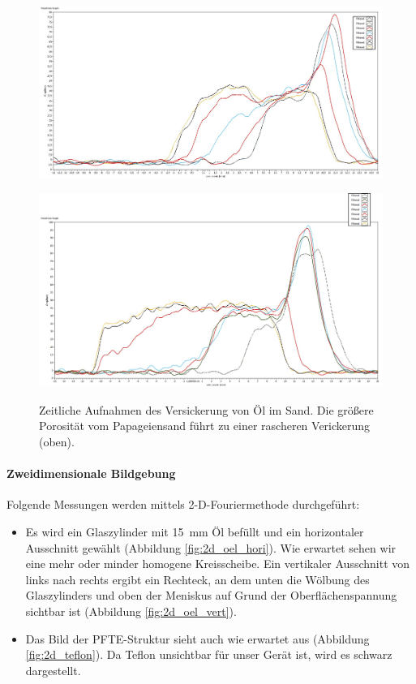 \documentclass[a4paper]{scrartcl} %
\begin{document}
\begin{figure}[htbp]
	{
		\centering
		\includegraphics[width=.8 \linewidth]{./Resources/Teil_3/oeldiff_chinchilla.jpg}
		\label{fig:oeldiff_chinchilla}
		\vspace{1cm}
		
		\centering
		\includegraphics[width=.8 \linewidth]{./Resources/Teil_3/oeldiff_papa.jpg}
		\label{fig:oeldiff_papa}
	}	
	\caption{Zeitliche Aufnahmen des Versickerung von Öl im Sand. Die größere Porosität vom Papageiensand führt zu einer rascheren Verickerung (oben).}
	\label{fig:oel_diff}
	
\end{figure}

\paragraph{Zweidimensionale Bildgebung}

Folgende Messungen werden mittels 2-D-Fouriermethode durchgeführt:

\begin{itemize}
	\item Es wird ein Glaszylinder mit \SI{15}{mm} Öl befüllt und ein horizontaler Ausschnitt gewählt (Abbildung \ref{fig:2d_oel_hori}). Wie erwartet sehen wir eine mehr oder minder homogene Kreisscheibe. Ein vertikaler Ausschnitt von links nach rechts ergibt ein Rechteck, an dem unten die Wölbung des Glaszylinders und oben der Meniskus auf Grund der Oberflächenspannung sichtbar ist (Abbildung \ref{fig:2d_oel_vert}).
	\item Das Bild der PFTE-Struktur sieht auch wie erwartet aus (Abbildung \ref{fig:2d_teflon}). Da Teflon unsichtbar für unser Gerät ist, wird es schwarz dargestellt.
\end{itemize}
\end{document}
